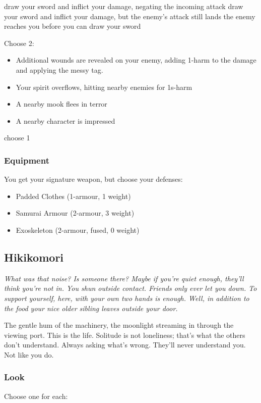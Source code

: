 {draw your sword and inflict your damage, negating the incoming attack}
{draw your sword and inflict your damage, but the enemy's attack still lands}
{the enemy reaches you before you can draw your sword}

{Choose 2:
\begin{itemize}
\item Additional wounds are revealed on your enemy, adding 1-harm to the damage and applying the messy tag.
\item Your spirit overflows, hitting nearby enemies for 1s-harm
\item A nearby mook flees in terror
\item A nearby character is impressed
\end{itemize}}
{choose 1}

\subsubsection{Equipment}
You get your signature weapon, but choose your defenses:
\begin{itemize}
\item Padded Clothes (1-armour, 1 weight)
\item Samurai Armour (2-armour, 3 weight)
\item Exoskeleton (2-armour, fused, 0 weight)
\end{itemize}



\subsection{Hikikomori}
{\itshape What was that noise? Is someone there? Maybe if you're quiet enough, they'll think you're not in. You shun outside contact. Friends only ever let you down. To support yourself, here, with your own two hands is enough. Well, in addition to the food your nice older sibling leaves outside your door.

The gentle hum of the machinery, the moonlight streaming in through the viewing port. This is the life. Solitude is not loneliness; that's what the others don't understand. Always asking what's wrong. They'll never understand you. Not like you do.}

\subsubsection{Look}
Choose one for each:

